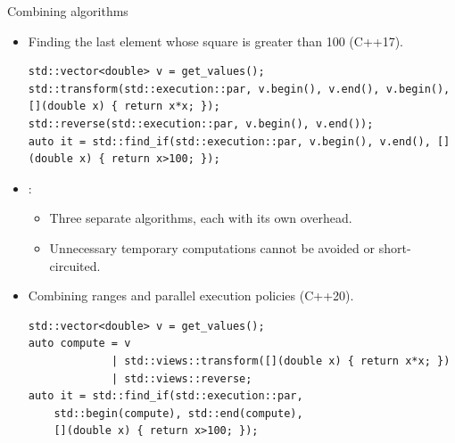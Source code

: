 \begin{frame}[t,fragile]{Combining algorithms}
\begin{itemize}

    \item Finding the last element whose square is greater than 100 (C++17).
\begin{lstlisting}
std::vector<double> v = get_values();
std::transform(std::execution::par, v.begin(), v.end(), v.begin(), [](double x) { return x*x; });
std::reverse(std::execution::par, v.begin(), v.end());
auto it = std::find_if(std::execution::par, v.begin(), v.end(), [](double x) { return x>100; });
\end{lstlisting}

    \item {}:
    \begin{itemize}
        \item Three separate algorithms, each with its own overhead.
        \item Unnecessary temporary computations cannot be avoided or short-circuited.
    \end{itemize}

    \item Combining ranges and parallel execution policies (C++20).
    
\begin{lstlisting}
std::vector<double> v = get_values();
auto compute = v 
             | std::views::transform([](double x) { return x*x; })
             | std::views::reverse;
auto it = std::find_if(std::execution::par, 
    std::begin(compute), std::end(compute), 
    [](double x) { return x>100; });
\end{lstlisting}

\end{itemize}
\end{frame}

